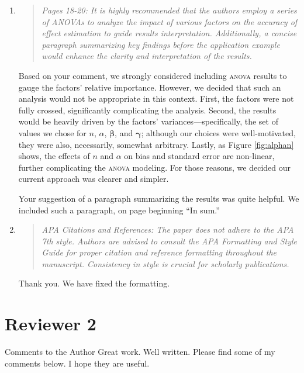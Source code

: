 \documentclass[]{article}
\newenvironment{itquote}
  {\begin{quote} \itshape}
  {\end{quote}\ignorespacesafterend}
\begin{document}
\begin{enumerate}
\item \begin{itquote}     Pages 18-20: It is highly recommended that the authors employ a series of ANOVAs to analyze the impact of various factors on the accuracy of effect estimation to guide results interpretation. Additionally, a concise paragraph summarizing key findings before the application example would enhance the clarity and interpretation of the results.
\end{itquote}
Based on your comment, we strongly considered including \textsc{anova} results to gauge the factors' relative importance. However, we decided that such an analysis would not be appropriate in this context. First, the factors were not fully crossed, significantly complicating the analysis. Second, the results would be heavily driven by the factors' variances---specifically, the set of values we chose for $n$, $\alpha$, $\bm\beta$, and $\bm\gamma$; although our choices were well-motivated, they were also, necessarily, somewhat arbitrary. 
Lastly, as Figure \ref{fig:alphan} shows, the effects of $n$ and $\alpha$ on bias and standard error are non-linear, further complicating the \textsc{anova} modeling. For those reasons, we decided our current approach was clearer and simpler.

Your suggestion of a paragraph summarizing the results was quite helpful. We included such a paragraph, on page \pageref{simsum} beginning ``In sum.''

\item \begin{itquote}      APA Citations and References: The paper does not adhere to the APA 7th style. Authors are advised to consult the APA Formatting and Style Guide for proper citation and reference formatting throughout the manuscript. Consistency in style is crucial for scholarly publications.
\end{itquote}
Thank you. We have fixed the formatting.
\end{enumerate}

\section*{Reviewer 2}
Comments to the Author
Great work. Well written. Please find some of my comments below. I hope they are useful.
\end{document}
